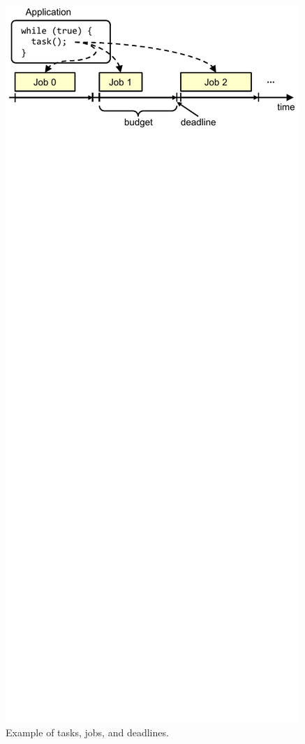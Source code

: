 \begin{figure}
  \begin{center}
    \includegraphics{exec_time_prediction/figs/jobs.pdf}
    \caption{Example of tasks, jobs, and deadlines.}
    \label{fig:exec_time_prediction.applications.jobs}
  \end{center}
\end{figure}

